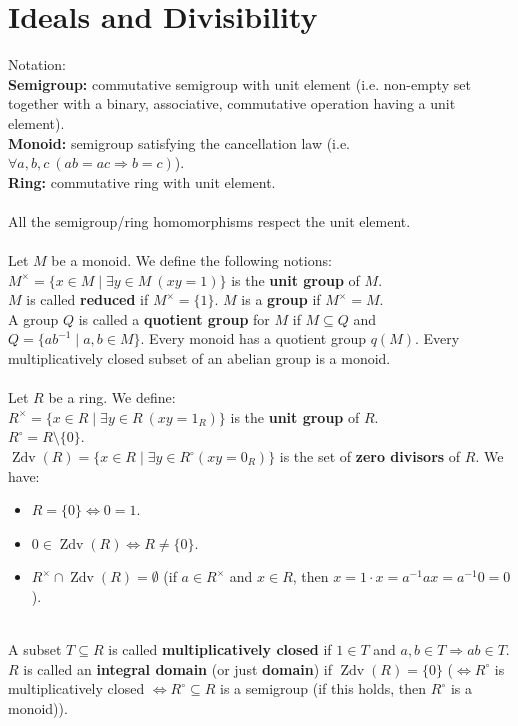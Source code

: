 \documentclass[12pt,a4paper]{report}
\theoremstyle{definition}
\theoremstyle{num.custom-title}
\DeclareMathOperator{\Zdv}{Zdv}
\DeclareMathOperator{\imp}{\Rightarrow}
\DeclareMathOperator{\sm}{\setminus}
\DeclareMathOperator{\sse}{\subseteq}
\newcommand{\IFF}{\Longleftrightarrow}
\begin{document}
\chapter{Ideals and Divisibility}

Notation:\\
\textbf{Semigroup:} commutative semigroup with unit element (i.e. non-empty set together with a binary, associative, commutative operation having a unit element).\\
\textbf{Monoid:} semigroup satisfying the cancellation law (i.e. $\forall a,b,c \ (ab=ac \imp b=c)$).\\
\textbf{Ring:} commutative ring with unit element.\\
\\
All the semigroup/ring homomorphisms respect the unit element.\\
\\
Let $M$ be a monoid. We define the following notions:\\
$M^\times= \{x \in M \mid \exists y \in M \ (xy=1)\}$ is the \textbf{unit group} of $M$.\\
$M$ is called \textbf{reduced} if $M^\times=\{1\}$. $M$ is a \textbf{group} if $M^\times=M$.\\
A group $Q$ is called a \textbf{quotient group} for $M$ if $M \sse Q$ and $Q=\{ab^{-1} \mid a,b \in M\}$. Every monoid has a quotient group $q(M)$. Every multiplicatively closed subset of an abelian group is a monoid.\\
\\
Let $R$ be a ring. We define:\\
$R^\times=\{x \in R \mid \exists y \in R \ (xy=1_R)\}$ is the \textbf{unit group} of $R$.\\
$R^\circ=R \sm \{0\}$.\\
$\Zdv(R)=\{x \in R \mid \exists y \in R^\circ (xy=0_R)\}$ is the set of \textbf{zero divisors} of $R$.
We have:
\begin{itemize}
\item $R=\{0\} \IFF 0=1$.
\item $0 \in \Zdv(R) \IFF R \neq \{0\}$.
\item $R^\times \cap \Zdv(R) = \emptyset$ (if $a \in R^\times$ and $x \in R$, then $x=1 \cdot x = a^{-1} a x = a^{-1} 0 = 0$).
\end{itemize}
\ \\
A subset $T \sse R$ is called \textbf{multiplicatively closed} if $1 \in T$ and $a,b \in T \imp ab \in T$.\\
$R$ is called an \textbf{integral domain} (or just \textbf{domain}) if $\Zdv(R)=\{0\}$ ($\IFF R^\circ$ is multiplicatively closed $\IFF R^\circ \sse R$ is a semigroup (if this holds, then $R^\circ$ is a monoid)).\\
\end{document}
